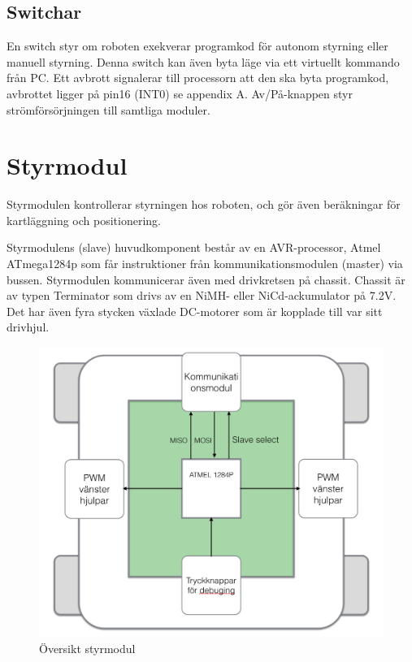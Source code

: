 \documentclass[a4paper,12pt,fleqn]{article}
\begin{document}
\subsection{Switchar}
En switch styr om roboten exekverar programkod för autonom styrning eller manuell styrning. Denna switch kan även byta läge via ett virtuellt kommando från PC. Ett avbrott signalerar till processorn att den ska byta programkod, avbrottet ligger på pin16 (INT0) se appendix A. Av/På-knappen styr strömförsörjningen till samtliga moduler. 


\newpage
\section{Styrmodul}
Styrmodulen kontrollerar styrningen hos roboten, och gör även beräkningar för kartläggning och positionering. 

Styrmodulens (slave) huvudkomponent består av en AVR-processor, Atmel ATmega1284p som får instruktioner från kommunikationsmodulen (master) via bussen. Styrmodulen kommunicerar även med drivkretsen på chassit. Chassit är av typen Terminator som drivs av en NiMH- eller NiCd-ackumulator på 7.2V. Det har även fyra stycken växlade DC-motorer som är kopplade till var sitt drivhjul. 

\begin{figure}[htp] %
  \begin{center}
  \includegraphics[keepaspectratio=true,width=\linewidth]{bilder/styrmodul}  %
  \end{center}
  \caption{Översikt styrmodul} %
  \label{fig:styr} %
\end{figure}
\newpage
\end{document}
